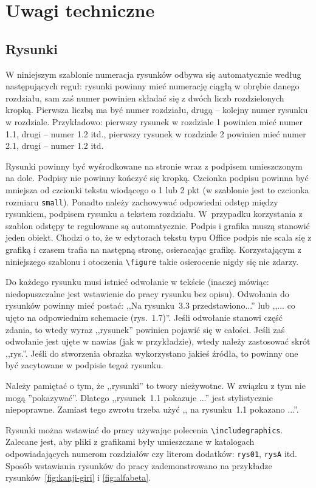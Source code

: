\chapter{Uwagi techniczne}%
\label{chap:testy}
\section{Rysunki}
W niniejszym szablonie numeracja rysunków odbywa się automatycznie według następujących reguł: rysunki powinny mieć numerację ciągłą w obrębie danego rozdziału, sam zaś numer powinien składać się z dwóch liczb rozdzielonych kropką. Pierwsza liczbą ma być numer rozdziału, drugą -- kolejny numer rysunku w rozdziale. Przykładowo: pierwszy rysunek w rozdziale 1 powinien mieć numer 1.1, drugi -- numer 1.2 itd., pierwszy rysunek w rozdziale 2 powinien mieć numer 2.1, drugi -- numer 1.2 itd. 

Rysunki powinny być wyśrodkowane na stronie wraz z podpisem umieszczonym na dole. Podpisy nie powinny kończyć się kropką. Czcionka podpisu powinna być mniejsza od czcionki tekstu wiodącego o 1 lub 2 pkt (w szablonie jest to czcionka rozmiaru \texttt{small}). Ponadto należy zachowywać odpowiedni odstęp między rysunkiem, podpisem rysunku a tekstem rozdziału. 
W~przypadku korzystania z szablon odstępy te regulowane są automatycznie. Podpis i grafika muszą stanowić jeden obiekt. Chodzi o to, że w edytorach tekstu typu Office podpis nie scala się z grafiką i czasem trafia na następną stronę, osieracając grafikę. Korzystającym z niniejszego szablonu i otoczenia \verb?\figure? takie osierocenie nigdy się nie zdarzy.  

Do każdego rysunku musi istnieć odwołanie w tekście (inaczej mówiąc: niedopuszczalne jest wstawienie do pracy rysunku bez opisu). Odwołania do rysunków powinny mieć postać: ,,Na rysunku~3.3 przedstawiono...'' lub ,,... co ujęto na odpowiednim schemacie (rys.~1.7)''. 
Jeśli odwołanie stanowi część zdania, to wtedy wyraz ,,rysunek'' powinien pojawić się w całości. Jeśli zaś odwołanie jest ujęte w nawias (jak w przykładzie), wtedy należy zastosować skrót ,,rys.''. Jeśli do stworzenia obrazka wykorzystano jakieś źródła, to powinny one być zacytowane w podpisie tegoż rysunku. 

Należy pamiętać o tym, że ,,rysunki'' to twory nieżywotne. W związku z tym nie mogą ''pokazywać''. Dlatego ,,rysunek~1.1 pokazuje ...'' jest stylistycznie niepoprawne. Zamiast tego zwrotu trzeba użyć ,, na rysunku~1.1 pokazano ...''.

Rysunki można wstawiać do pracy używając polecenia \verb|\includegraphics|. Zalecane jest, aby pliki z grafikami były umieszczane w katalogach 
odpowiadających numerom rozdziałów czy literom dodatków: \verb|rys01|, \verb|rysA| itd. Sposób wstawiania rysunków do pracy zademonstrowano na przykładze rysunków~\ref{fig:kanji-giri} i \ref{fig:alfabeta}.

